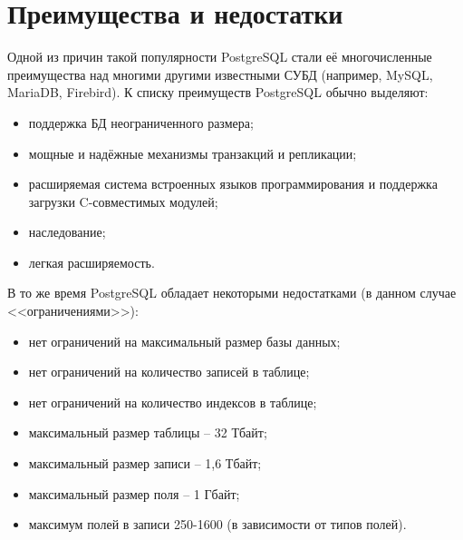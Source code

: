 \section{Преимущества и недостатки}\label{subsec:advantages-and-disadvantages}

Одной из причин такой популярности PostgreSQL стали её многочисленные преимущества над многими другими известными СУБД (например, MySQL, MariaDB, Firebird). К списку преимуществ PostgreSQL обычно выделяют:
\begin{itemize}
    \item поддержка БД неограниченного размера;
    \item мощные и надёжные механизмы транзакций и репликации;
    \item расширяемая система встроенных языков программирования и поддержка загрузки C-совместимых модулей;
    \item наследование;
    \item легкая расширяемость.\cite{cischool}
\end{itemize}

В то же время PostgreSQL обладает некоторыми недостатками (в данном случае <<ограничениями>>):
\begin{itemize}
    \item нет ограничений на максимальный размер базы данных;
    \item нет ограничений на количество записей в таблице;
    \item нет ограничений на количество индексов в таблице;
    \item максимальный размер таблицы -- 32 Тбайт;
    \item максимальный размер записи -- 1,6 Тбайт;
    \item максимальный размер поля -- 1 Гбайт;
    \item максимум полей в записи 250-1600 (в зависимости от типов полей).\cite{directum}
\end{itemize}

\newpage